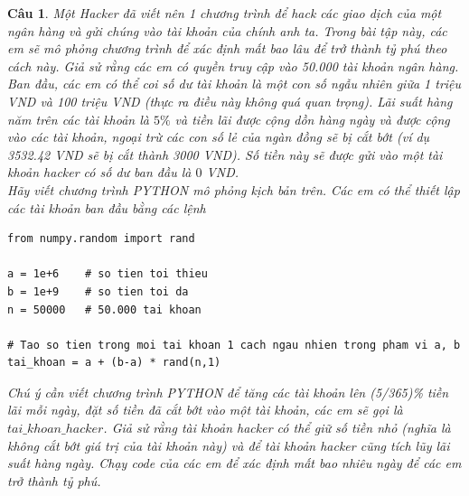 \documentclass[answers]{exam}
\newtheorem{bt}{Câu}
\begin{document}
\begin{bt} 
Một Hacker đã viết nên 1 chương trình để hack các giao dịch của một ngân hàng và gửi chúng vào tài khoản của chính anh ta. Trong bài tập này, các em sẽ mô phỏng chương trình để xác định mất bao lâu để trở thành tỷ phú theo cách này.
Giả sử rằng các em có quyền truy cập vào 50.000 tài khoản ngân hàng. Ban đầu, các em có thể coi số dư tài khoản là một con số ngẫu nhiên giữa 1 triệu VND và 100 triệu VND (thực ra điều này không quá quan trọng). Lãi suất hàng năm trên các tài khoản là $5\%$ và tiền lãi được cộng dồn hàng ngày và được cộng vào các tài khoản, ngoại trừ các con số lẻ của ngàn đồng sẽ bị cắt bớt (ví dụ 3532.42 VND sẽ bị cắt thành 3000 VND). Số tiền này sẽ được gửi vào một tài khoản hacker có số dư ban đầu là $0$ VND. \\

Hãy viết chương trình PYTHON mô phỏng kịch bản trên. Các em có thể thiết lập các tài khoản ban đầu bằng các lệnh 
%
\begin{lstlisting}[frame=single] 
from numpy.random import rand

a = 1e+6    # so tien toi thieu
b = 1e+9    # so tien toi da
n = 50000   # 50.000 tai khoan

# Tao so tien trong moi tai khoan 1 cach ngau nhien trong pham vi a, b
tai_khoan = a + (b-a) * rand(n,1)
\end{lstlisting}
%
Chú ý cần viết chương trình PYTHON để tăng các tài khoản lên (5/365)\% tiền lãi mỗi ngày, đặt số tiền đã cắt bớt vào một tài khoản, các em sẽ gọi là $tai\_khoan\_hacker$. Giả sử rằng tài khoản hacker có thể giữ số tiền nhỏ (nghĩa là không cắt bớt giá trị của tài khoản này) và để tài khoản hacker cũng tích lũy lãi suất hàng ngày. Chạy code của các em để xác định mất bao nhiêu ngày để các em trở thành tỷ phú.
\end{bt}
\end{document}
